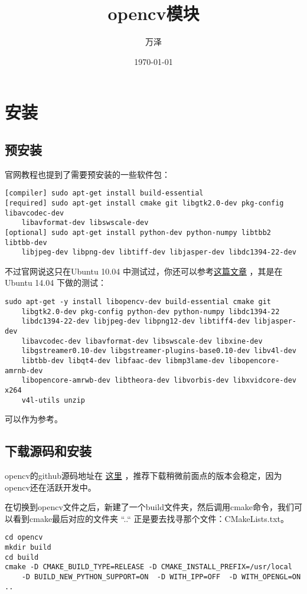\documentclass[11pt,oneside]{article}
\author{万泽}
\date{\today}
\title{opencv模块}
\begin{document}
\maketitle
\tableofcontents



\section{安装}
\label{sec-1}
\subsection{预安装}
\label{sec-1-1}
官网教程也提到了需要预安装的一些软件包：

\begin{Verbatim}
[compiler] sudo apt-get install build-essential
[required] sudo apt-get install cmake git libgtk2.0-dev pkg-config libavcodec-dev 
    libavformat-dev libswscale-dev
[optional] sudo apt-get install python-dev python-numpy libtbb2 libtbb-dev 
    libjpeg-dev libpng-dev libtiff-dev libjasper-dev libdc1394-22-dev
\end{Verbatim}

不过官网说这只在Ubuntu 10.04 中测试过，你还可以参考\href{http://rodrigoberriel.com/2014/10/installing-opencv-3-0-0-on-ubuntu-14-04/}{这篇文章} ，其是在Ubuntu 14.04 下做的测试：
\begin{Verbatim}
sudo apt-get -y install libopencv-dev build-essential cmake git 
    libgtk2.0-dev pkg-config python-dev python-numpy libdc1394-22 
    libdc1394-22-dev libjpeg-dev libpng12-dev libtiff4-dev libjasper-dev
    libavcodec-dev libavformat-dev libswscale-dev libxine-dev
    libgstreamer0.10-dev libgstreamer-plugins-base0.10-dev libv4l-dev 
    libtbb-dev libqt4-dev libfaac-dev libmp3lame-dev libopencore-amrnb-dev 
    libopencore-amrwb-dev libtheora-dev libvorbis-dev libxvidcore-dev x264 
    v4l-utils unzip
\end{Verbatim}
可以作为参考。

\subsection{下载源码和安装}
\label{sec-1-2}
opencv的github源码地址在 \href{https://github.com/Itseez/opencv}{这里} ，推荐下载稍微前面点的版本会稳定，因为opencv还在活跃开发中。

在切换到opencv文件之后，新建了一个build文件夹，然后调用cmake命令，我们可以看到cmake最后对应的文件夹 “..“ 正是要去找寻那个文件：CMakeLists.txt。
\begin{Verbatim}
cd opencv
mkdir build
cd build
cmake -D CMAKE_BUILD_TYPE=RELEASE -D CMAKE_INSTALL_PREFIX=/usr/local 
    -D BUILD_NEW_PYTHON_SUPPORT=ON  -D WITH_IPP=OFF  -D WITH_OPENGL=ON ..
\end{Verbatim}
\end{document}
